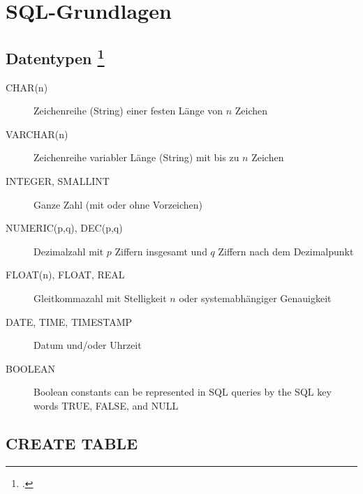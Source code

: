 \documentclass{bschlangaul-theorie}
\begin{document}

\chapter{SQL-Grundlagen}

%

\section{Datentypen
\footcite[Seite 132]{winter}}

\begin{description}
\item[CHAR(n)]

Zeichenreihe (String) einer festen Länge von $n$ Zeichen

\item[VARCHAR(n)]

Zeichenreihe variabler Länge (String) mit bis zu $n$
Zeichen

\item[INTEGER, SMALLINT]

Ganze Zahl (mit oder ohne Vorzeichen)

\item[NUMERIC(p,q), DEC(p,q)]

Dezimalzahl mit $p$ Ziffern insgesamt und $q$
Ziffern nach dem Dezimalpunkt

\item[FLOAT(n), FLOAT, REAL]

Gleitkommazahl mit Stelligkeit $n$ oder systemabhängiger Genauigkeit

\item[DATE, TIME, TIMESTAMP]

Datum und/oder Uhrzeit

\item[BOOLEAN]

Boolean constants can be represented in SQL queries by the SQL key words
TRUE, FALSE, and NULL
\end{description}

\section{CREATE TABLE}
\end{document}
